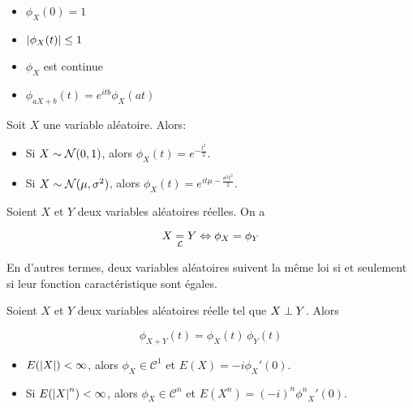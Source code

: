 \begin{proposition}
	\begin{itemize}
		\item $\phi_{X}(0) = 1$
		\item $\abs{\phi_{X}(t)} \leq 1$
		\item $\phi_{X}$ est continue
		\item $\phi_{aX + b}(t) = e^{itb} \phi_{X}(at)$
	\end{itemize}
\end{proposition}

\begin{theorem}
	Soit $X$ une variable aléatoire. Alors:

	\begin{itemize}
		\item Si $X \sim \mathcal{N}(0, 1)$, alors $\phi_{X}(t) =
			e^{-\frac{t^{2}}{2}}$.
		\item Si $X \sim \mathcal{N}(\mu, \sigma^{2})$, alors $\phi_{X}(t)
			= e^{it \mu - \frac{\sigma^{2}t^{2}}{2}}$.
	\end{itemize}
\end{theorem}

\begin{theorem}
	Soient $X$ et $Y$ deux variables aléatoires réelles. On a

	\begin{equation}
		X \underset{\mathcal{L}}{=} Y \Leftrightarrow \phi_{X} = \phi_{Y}
	\end{equation}

	En d'autres termes, deux variables aléatoires suivent la même loi si et
	seulement si leur fonction caractéristique sont égales.
\end{theorem}

\begin{theorem}
	Soient $X$ et $Y$ deux variables aléatoires réelle tel que $X
	\perp Y$.
	Alors

	\begin{equation}
		\phi_{X + Y}(t) = \phi_{X}(t) \, \phi_{Y}(t)
	\end{equation}
\end{theorem}

\begin{proposition}
	\begin{itemize}
		\item $E(\abs{X}) < \infty$, alors $\phi_{X} \in \mathcal{C}^{1}$ et
			$E(X) = -i \phi_{X}'(0)$.
		\item Si $E(\abs{X}^{n}) < \infty$, alors $\phi_{X} \in
			\mathcal{C}^{n}$ et $E(X^{n}) = (-i)^{n} {\phi^{n}}_{X}'(0)$.
	\end{itemize}
\end{proposition}


